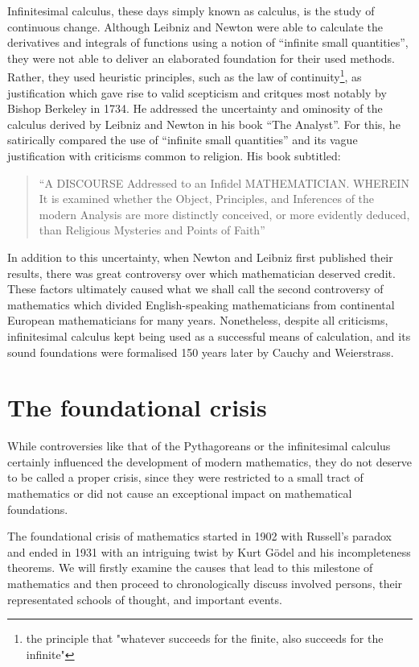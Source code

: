 \documentclass[hidelinks]{article}
\theoremstyle{plain}
\theoremstyle{definition}
\theoremstyle{rem}
\begin{document}
Infinitesimal calculus, these days simply known as calculus, is the study of continuous change. Although Leibniz and Newton were able to calculate the derivatives and integrals of functions using a notion of ``infinite small quantities'', they were not able to deliver an elaborated foundation for their used methods. Rather, they used heuristic principles, such as the law of continuity\footnote{the principle that "whatever succeeds for the finite, also succeeds for the infinite"}, as justification which gave rise to valid scepticism and critques most notably by Bishop Berkeley in 1734. He addressed the uncertainty and ominosity of the calculus derived by Leibniz and Newton in his book ``The Analyst''. For this, he satirically compared the use of ``infinite small quantities'' and its vague justification with criticisms common to religion. His book subtitled:
\begin{quote}
	``A DISCOURSE Addressed to an Infidel MATHEMATICIAN\@. WHEREIN It is examined whether the Object, Principles, and Inferences of the modern Analysis are more distinctly conceived, or more evidently deduced, than Religious Mysteries and Points of Faith''
\end{quote}
In addition to this uncertainty, when Newton and Leibniz first published their results, there was great controversy over which mathematician deserved credit. These factors ultimately caused what we shall call the second controversy of mathematics which divided English-speaking mathematicians from continental European mathematicians for many years. Nonetheless, despite all criticisms, infinitesimal calculus kept being used as a successful means of calculation, and its sound foundations were formalised 150 years later by Cauchy and Weierstrass.

\section{The foundational crisis}
While controversies like that of the Pythagoreans or the infinitesimal calculus certainly influenced the development of modern mathematics, they do not deserve to be called a proper crisis, since they were restricted to a small tract of mathematics or did not cause an exceptional impact on mathematical foundations.

The foundational crisis of mathematics started in 1902 with Russell's paradox and ended in 1931 with an intriguing twist by Kurt Gödel and his incompleteness theorems.
We will firstly examine the causes that lead to this milestone of mathematics and then proceed to chronologically discuss involved persons, their representated schools of thought, and important events.
\end{document}
